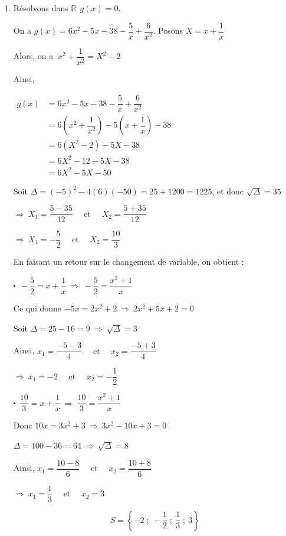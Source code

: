\documentclass[12pt,a4paper]{article}
\begin{document}
\begin{itemize}
\begin{enumerate}
\item Résolvons dans $\mathbb{R}\ \ g(x)=0$.

On a $g(x)=6x^{2}-5x-38-\dfrac{5}{x}+\dfrac{6}{x^{2}}$. Posons $X=x+\dfrac{1}{x}$

Alors, on a $\ x^{2}+\dfrac{1}{x^{2}}=X^{2}-2$

Ainsi,

$
\begin{aligned} 
g(x) &=6x^{2}-5x-38-\dfrac{5}{x}+\dfrac{6}{x^{2}} \\ 
&=6\left(x^{2}+\dfrac{1}{x^{2}}\right)-5\left(x+\dfrac{1}{x}\right)-38 \\ 
&=6(X^{2}-2)-5X-38 \\ 
&=6X^{2}-12-5X-38 \\ 
&=6X^{2}-5X-50 
\end{aligned}
$

Soit $\Delta=(-5)^{2}-4(6)(-50)=25+1200=1225$, et donc $\sqrt{\Delta}=35$

$\Rightarrow\ X_{1}=\dfrac{5-35}{12}\quad\text{ et }\quad X_{2}=\dfrac{5+35}{12}$

$\Rightarrow\ X_{1}=-\dfrac{5}{2}\quad\text{ et }\quad X_{2}=\dfrac{10}{3}$

En faisant un retour sur le changement de variable, on obtient :

$\centerdot\ \ -\dfrac{5}{2}=x+\dfrac{1}{x}\ \Rightarrow\ -\dfrac{5}{2}=\dfrac{x^{2}+1}{x}$

Ce qui donne $-5x=2x^{2}+2\ \Rightarrow\ 2x^{2}+5x+2=0$

Soit $\Delta=25-16=9\ \Rightarrow\ \sqrt{\Delta}=3$

Ainsi, $x_{1}=\dfrac{-5-3}{4}\quad\text{ et }\quad x_{2}=\dfrac{-5+3}{4}$

$\Rightarrow\ x_{1}=-2\quad\text{ et }\quad x_{2}=-\dfrac{1}{2}$

$\centerdot\ \ \dfrac{10}{3}=x+\dfrac{1}{x}\ \Rightarrow\ \dfrac{10}{3}=\dfrac{x^{2}+1}{x}$

Donc $10x=3x^{2}+3\ \Rightarrow\ 3x^{2}-10x+3=0$

$\Delta=100-36=64\ \Rightarrow\ \sqrt{\Delta}=8$

Ainsi, $x_{1}=\dfrac{10-8}{6}\quad\text{ et }\quad x_{2}=\dfrac{10+8}{6}$

$\Rightarrow\ x_{1}=\dfrac{1}{3}\quad\text{ et }\quad x_{2}=3$

$$ \boxed{ S=\left\lbrace-2\;;\ -\dfrac{1}{2}\;;\ \dfrac{1}{3}\;;\ 3\right\rbrace } $$

\end{enumerate}

\end{itemize}
\end{document}
